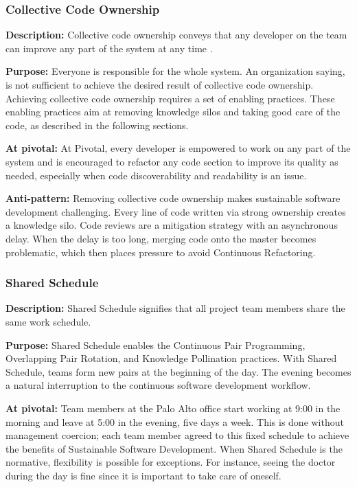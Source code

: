 \begin{table}[]
\subsubsection{Collective Code Ownership}

\textbf{Description:} Collective code ownership conveys that any developer on the team can improve any part of the system at any time \cite{ExtremeProgramming2004}. 

\textbf{Purpose:} Everyone is responsible for the whole system. An organization saying,  is not sufficient to achieve the desired result of collective code ownership. Achieving collective code ownership requires a set of enabling practices. These enabling practices aim at removing knowledge silos and taking good care of the code, as described in the following sections.

\textbf{At pivotal:} At Pivotal, every developer is empowered to work on any part of the system and is encouraged to refactor any code section to improve its quality as needed, especially when code discoverability and readability is an issue.

\textbf{Anti-pattern:} Removing collective code ownership makes sustainable software development challenging. Every line of code written via strong ownership creates a knowledge silo. Code reviews are a mitigation strategy with an asynchronous delay. When the delay is too long, merging code onto the master becomes problematic, which then places pressure to avoid Continuous Refactoring.  

\subsubsection{Shared Schedule}
\textbf{Description:} Shared Schedule signifies that all project team members share the same work schedule. 

\textbf{Purpose:} Shared Schedule enables the Continuous Pair Programming, Overlapping Pair Rotation, and Knowledge Pollination practices. With Shared Schedule, teams form new pairs at the beginning of the day. The evening becomes a natural interruption to the continuous software development workflow. 

\textbf{At pivotal:} Team members at the Palo Alto office start working at 9:00 in the morning and leave at 5:00 in the evening, five days a week. This is done without management coercion; each team member agreed to this fixed schedule to achieve the benefits of Sustainable Software Development. When Shared Schedule is the normative, flexibility is possible for exceptions. For instance, seeing the doctor during the day is fine since it is important to take care of oneself.


\end{table}
